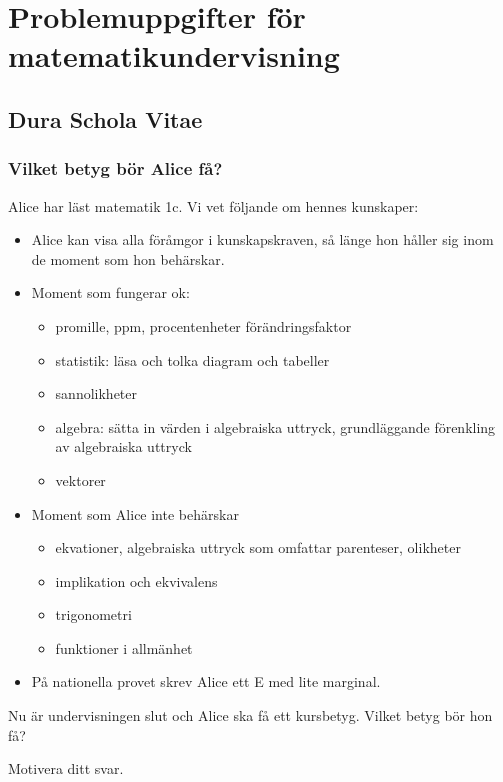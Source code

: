 \part*{Problemuppgifter för matematikundervisning}

\chapter{Dura Schola Vitae}

\setcounter{section}{0}
\section{Vilket betyg bör Alice få?}
Alice har läst matematik 1c. Vi vet följande om hennes kunskaper:

\begin{itemize}
  \item Alice kan visa alla föråmgor i kunskapskraven, så länge hon håller sig inom de moment som hon behärskar.
  \item Moment som fungerar ok:
    \begin{itemize}
      \item promille, ppm, procentenheter förändringsfaktor
      \item statistik: läsa och tolka diagram och tabeller
      \item sannolikheter
      \item algebra: sätta in värden i algebraiska uttryck, grundläggande förenkling av algebraiska uttryck
      \item vektorer
    \end{itemize}
  \item Moment som Alice inte behärskar
    \begin{itemize}
      \item ekvationer, algebraiska uttryck som omfattar parenteser, olikheter
      \item implikation och ekvivalens
      \item trigonometri
      \item funktioner i allmänhet
    \end{itemize}
  \item På nationella provet skrev Alice ett E med lite marginal.
\end{itemize}

\noindent Nu är undervisningen slut och Alice ska få ett kursbetyg. Vilket betyg bör hon få?

Motivera ditt svar.